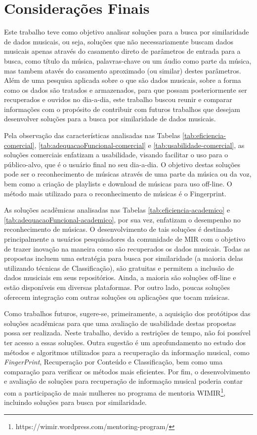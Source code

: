 \chapter{Considerações Finais} \label{cap:consideracoes-finais}

Este trabalho teve como objetivo analisar soluções para a busca por similaridade de dados musicais, ou seja, soluções que não necessariamente buscam dados musicais apenas através do casamento direto de parâmetros de entrada para a busca, como título da música, palavras-chave ou um áudio como parte da música, mas tambem atavés do casamento aproximado (ou similar) destes parâmetros. Além de uma pesquisa aplicada sobre o que são dados musicais, sobre a forma como os dados são tratados e armazenados, para que possam posteriormente ser recuperados e ouvidos no dia-a-dia, este trabalho buscou reunir e comparar informações com o propósito de contribuir com futuros trabalhos que desejam desenvolver soluções para a busca por similaridade de dados musicais.

Pela observação das características analisadas nas Tabelas \ref{tab:eficiencia-comercial}, \ref{tab:adequacaoFuncional-comercial} e \ref{tab:usabilidade-comercial}, as soluções comerciais enfatizam a usabilidade, visando facilitar o uso para o público-alvo, que é o usuário final no seu dia-a-dia. O objetivo destas soluções pode ser o reconhecimento de músicas através de uma parte da música ou da voz, bem como a criação de playlists e download de músicas para uso off-line. O método mais utilizado para o reconhecimento de músicas é o Fingerprint.

As soluções acadêmicas analisadas nas Tabelas \ref{tab:eficiencia-academico} e \ref{tab:adequacaoFuncional-academico}, por sua vez, enfatizam o desempenho no reconhecimento de músicas. O desenvolvimento de tais soluções é destinado principalmente a usuários pesquisadores da comunidade de MIR com o objetivo de trazer inovação na maneira como são recuperados os dados musicais. Todas as propostas incluem uma estratégia para busca por similaridade (a maioria delas utilizando técnicas de Classificação), são gratuitas e permitem a inclusão de dados musiciais em seus repositórios. Ainda, a maioria são soluções off-line e estão disponíveis em diversas plataformas. Por outro lado, poucas soluções oferecem integração com outras soluções ou aplicações que tocam músicas. 

Como trabalhos futuros, sugere-se, primeiramente, a aquisição dos protótipos das soluções acadêmicas para que uma avaliação de usabilidade destas propostas possa ser realizada. Neste trabalho, devido a restrições de tempo, não foi possível ter acesso a essas soluções. Outra sugestão é um aprofundamento no estudo dos métodos e algoritmos utilizados para a recuperação da informação musical, como \textit{FingerPrint}, Recuperação por Conteúdo e Classificação, bem como uma comparação para verificar os métodos mais eficientes. Por fim, o desenvolvimento e avaliação de soluções para recuperação de informação musical poderia contar com a participação de mais mulheres no programa de mentoria WIMIR\footnote{https://wimir.wordpress.com/mentoring-program/}, incluindo soluções para busca por similaridade.
